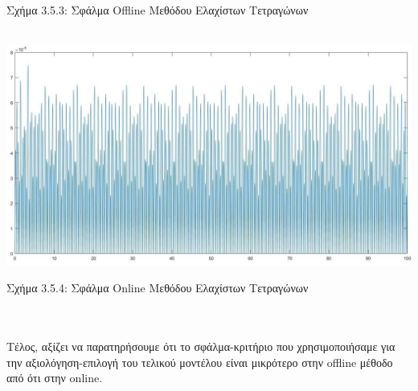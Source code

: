 \documentclass[12pt]{article}
\begin{document}
\centerline{Σχήμα 3.5.3: Σφάλμα Offline Μεθόδου Ελαχίστων Τετραγώνων}
\\
\includegraphics[width=\linewidth]{online_error.jpg}
\centerline{Σχήμα 3.5.4: Σφάλμα Online Μεθόδου Ελαχίστων Τετραγώνων}
\\ \\
Τέλος, αξίζει να παρατηρήσουμε ότι το σφάλμα-κριτήριο που χρησιμοποιήσαμε για την αξιολόγηση-επιλογή του τελικού μοντέλου είναι μικρότερο στην offline μέθοδο από ότι στην online.
\end{document}
